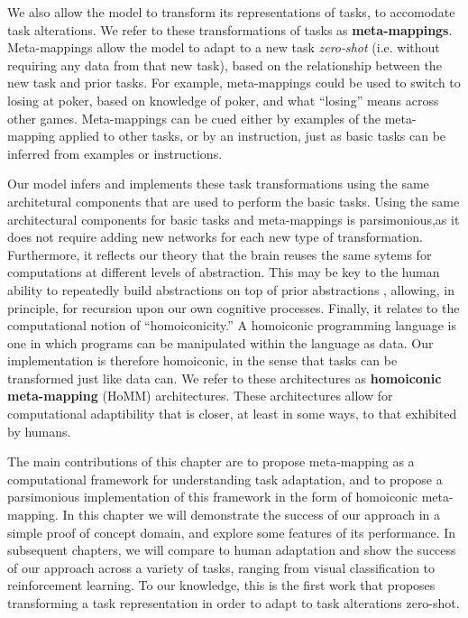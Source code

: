 We also allow the model to transform its representations of tasks, to accomodate task alterations. We refer to these transformations of tasks as \textbf{meta-mappings}. Meta-mappings allow the model to adapt to a new task \emph{zero-shot} (i.e. without requiring any data from that new task), based on the relationship between the new task and prior tasks. For example, meta-mappings could be used to switch to losing at poker, based on knowledge of poker, and what ``losing'' means across other games. Meta-mappings can be cued either by examples of the meta-mapping applied to other tasks, or by an instruction, just as basic tasks can be inferred from examples or instructions. 

Our model infers and implements these task transformations using the same architetural components that are used to perform the basic tasks. Using the same architectural components for basic tasks and meta-mappings is parsimonious,as it does not require adding new networks for each new type of transformation. Furthermore, it reflects our theory that the brain reuses the same sytems for computations at different levels of abstraction. This may be key to the human ability to repeatedly build abstractions on top of prior abstractions \citep{Wilensky1991, Hazzan1999, Lampinen2017b}, allowing, in principle, for recursion upon our own cognitive processes. Finally, it relates to the computational notion of ``homoiconicity.'' A homoiconic programming language is one in which programs can be manipulated within the language as data. Our implementation is therefore homoiconic, in the sense that tasks can be transformed just like data can. We refer to these architectures as \textbf{homoiconic meta-mapping} (HoMM) architectures. These architectures allow for computational adaptibility that is closer, at least in some ways, to that exhibited by humans.  

The main contributions of this chapter are to propose meta-mapping as a computational framework for understanding task adaptation, and to propose a parsimonious implementation of this framework in the form of homoiconic meta-mapping. In this chapter we will demonstrate the success of our approach in a simple proof of concept domain, and explore some features of its performance. In subsequent chapters, we will compare to human adaptation and show the success of our approach across a variety of tasks, ranging from visual classification to reinforcement learning. To our knowledge, this is the first work that proposes transforming a task representation in order to adapt to task alterations zero-shot. 



